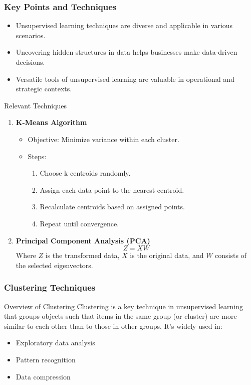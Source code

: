 \documentclass[aspectratio=169]{beamer}
\begin{document}
\begin{frame}[fragile]
    \frametitle{Key Points and Techniques}
    \begin{itemize}
        \item Unsupervised learning techniques are diverse and applicable in various scenarios.
        \item Uncovering hidden structures in data helps businesses make data-driven decisions.
        \item Versatile tools of unsupervised learning are valuable in operational and strategic contexts.
    \end{itemize}
    
    \begin{block}{Relevant Techniques}
        \begin{enumerate}
            \item \textbf{K-Means Algorithm}
            \begin{itemize}
                \item Objective: Minimize variance within each cluster.
                \item Steps:
                \begin{enumerate}
                    \item Choose k centroids randomly.
                    \item Assign each data point to the nearest centroid.
                    \item Recalculate centroids based on assigned points.
                    \item Repeat until convergence.
                \end{enumerate}
            \end{itemize}

            \item \textbf{Principal Component Analysis (PCA)}
            \begin{equation}
                Z = XW
            \end{equation}
            Where \(Z\) is the transformed data, \(X\) is the original data, and \(W\) consists of the selected eigenvectors.
        \end{enumerate}
    \end{block}
\end{frame}

\begin{frame}[fragile]
    \frametitle{Clustering Techniques}
    \begin{block}{Overview of Clustering}
        Clustering is a key technique in unsupervised learning that groups objects such that items in the same group (or cluster) are more similar to each other than to those in other groups. It's widely used in:
        \begin{itemize}
            \item Exploratory data analysis
            \item Pattern recognition
            \item Data compression
        \end{itemize}
    \end{block}
\end{frame}
\end{document}
